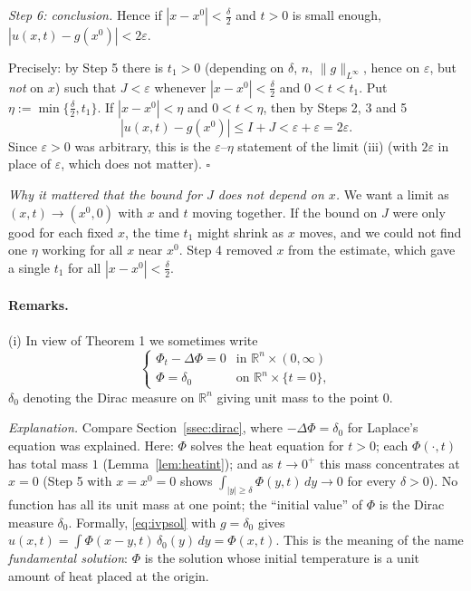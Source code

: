 \documentclass[11pt]{article}
\theoremstyle{plain}
\theoremstyle{definition}
\theoremstyle{remark}
\begin{document}
\emph{Step 6: conclusion.} Hence if $|x - x^0| < \frac\delta2$ and $t > 0$ is small enough, $|u(x,t) - g(x^0)| < 2\varepsilon$.

Precisely: by Step 5 there is $t_1 > 0$ (depending on $\delta$, $n$, $\|g\|_{L^\infty}$, hence on $\varepsilon$, but \emph{not} on $x$) such that $J < \varepsilon$ whenever $|x - x^0| < \frac\delta2$ and $0 < t < t_1$. Put $\eta := \min\{\frac\delta2, t_1\}$. If $|x - x^0| < \eta$ and $0 < t < \eta$, then by Steps 2, 3 and 5
$$ |u(x,t) - g(x^0)| \leq I + J < \varepsilon + \varepsilon = 2\varepsilon. $$
Since $\varepsilon > 0$ was arbitrary, this is the $\varepsilon$--$\eta$ statement of the limit (iii) (with $2\varepsilon$ in place of $\varepsilon$, which does not matter). $\square$

\emph{Why it mattered that the bound for $J$ does not depend on $x$.} We want a limit as $(x,t) \to (x^0,0)$ with $x$ and $t$ moving together. If the bound on $J$ were only good for each fixed $x$, the time $t_1$ might shrink as $x$ moves, and we could not find one $\eta$ working for all $x$ near $x^0$. Step 4 removed $x$ from the estimate, which gave a single $t_1$ for all $|x - x^0| < \frac\delta2$.

\paragraph{Remarks.}

(i) In view of Theorem 1 we sometimes write
$$ \begin{cases} \Phi_t - \Delta\Phi = 0 & \text{in } \mathbb{R}^n\times(0,\infty) \\ \Phi = \delta_0 & \text{on } \mathbb{R}^n\times\{t = 0\}, \end{cases} $$
$\delta_0$ denoting the Dirac measure on $\mathbb{R}^n$ giving unit mass to the point $0$.

\emph{Explanation.} Compare Section~\ref{ssec:dirac}, where $-\Delta\Phi = \delta_0$ for Laplace's equation was explained. Here: $\Phi$ solves the heat equation for $t > 0$; each $\Phi(\cdot,t)$ has total mass $1$ (Lemma~\ref{lem:heatint}); and as $t \to 0^+$ this mass concentrates at $x = 0$ (Step 5 with $x = x^0 = 0$ shows $\int_{|y| \geq \delta}\Phi(y,t)\,dy \to 0$ for every $\delta > 0$). No function has all its unit mass at one point; the ``initial value'' of $\Phi$ is the Dirac measure $\delta_0$. Formally, \eqref{eq:ivpsol} with $g = \delta_0$ gives $u(x,t) = \int\Phi(x - y,t)\,\delta_0(y)\,dy = \Phi(x,t)$. This is the meaning of the name \emph{fundamental solution}: $\Phi$ is the solution whose initial temperature is a unit amount of heat placed at the origin.
\end{document}
